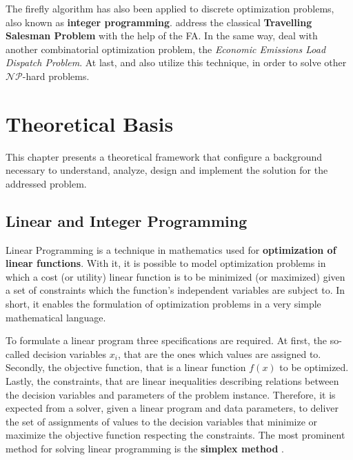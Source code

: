 \documentclass[tuberlin,cic,tc,openright,english,noabntcite,oneside]{iiufrgs}
\begin{document}
The firefly algorithm has also been applied to discrete optimization problems, also known as \textbf{integer programming}. \textcite{jati_evolutionary_2011} address the classical \textbf{Travelling Salesman Problem} with the help of the FA. In the same way, \textcite{apostolopoulos_application_2010} deal with another combinatorial optimization problem, the \emph{Economic Emissions Load Dispatch Problem}. At last, \textcite{sayadi_discrete_2010} and \textcite{sayadi_firefly-inspired_2013} also utilize this technique, in order to solve other $\mathcal{NP}$-hard problems.

\chapter{Theoretical Basis}
This chapter presents a theoretical framework that configure a background necessary to understand, analyze, design and implement the solution for the addressed problem.


\section{Linear and Integer Programming}
Linear Programming is a technique in mathematics used for \textbf{optimization of linear functions}. With it, it is possible to model optimization problems in which a cost (or utility) linear function is to be minimized (or maximized) given a set of constraints which the function's independent variables are subject to. In short, it enables the formulation of optimization problems in a very simple mathematical language.

To formulate a linear program three specifications are required. At first, the so-called decision variables $x_{i}$, that are the ones which values are assigned to. Secondly, the objective function, that is a linear function $f(x)$ to be optimized. Lastly, the constraints, that are linear inequalities describing relations between the decision variables and parameters of the problem instance. Therefore, it is expected from a solver, given a linear program and data parameters, to deliver the set of assignments of values to the decision variables that minimize or maximize the objective function respecting the constraints. The most prominent method for solving linear programming is the \textbf{simplex method} \parencite[p. 5-6]{shenoy_linear_2007}.
\end{document}
